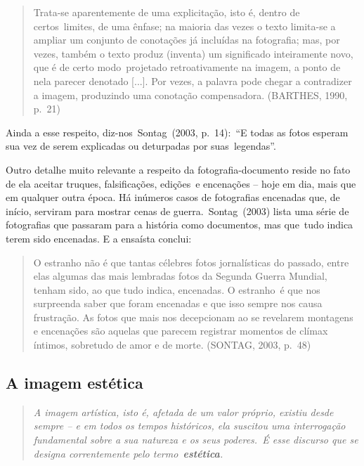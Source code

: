 \documentclass[
  letterpaper,
]{abntex2}
\begin{document}
\begin{quote}
Trata-se aparentemente de uma explicitação, isto é, dentro de
certos~limites, de uma ênfase; na maioria das vezes o texto limita-se a
ampliar um conjunto de conotações já incluídas na fotografia; mas, por
vezes, também o texto produz (inventa) um significado inteiramente novo,
que é de certo modo~projetado retroativamente na imagem, a ponto de nela
parecer denotado {[}...{]}. Por vezes, a palavra pode chegar a
contradizer a imagem, produzindo uma conotação compensadora. (BARTHES,
1990, p.~21)~ ~
\end{quote}

Ainda a esse respeito, diz-nos~Sontag~(2003, p.~14):~``E todas as fotos
esperam sua vez de serem explicadas ou deturpadas por suas~legendas''.

Outro detalhe muito relevante a respeito da fotografia-documento reside
no fato de ela aceitar truques, falsificações, edições~e encenações --
hoje em dia, mais que em qualquer outra época. Há inúmeros casos de
fotografias encenadas que, de início, serviram para mostrar cenas de
guerra.~Sontag~(2003) lista uma série de fotografias que passaram para a
história como documentos, mas que~tudo indica terem sido encenadas. E a
ensaísta conclui:~ ~

\begin{quote}
O estranho não é que tantas célebres fotos jornalísticas do passado,
entre elas algumas das mais lembradas fotos da Segunda Guerra Mundial,
tenham sido, ao que tudo indica, encenadas. O estranho~é que nos
surpreenda saber que foram encenadas e que isso sempre nos causa
frustração. As fotos que mais nos decepcionam ao se revelarem montagens
e encenações são aquelas que parecem registrar momentos de clímax
íntimos, sobretudo de amor e de morte. (SONTAG, 2003, p.~48)~ ~
\end{quote}

\hypertarget{a-imagem-estuxe9tica}{%
\subsection{A imagem estética}\label{a-imagem-estuxe9tica}}

\begin{quote}
\emph{A imagem artística, isto é, afetada de um valor próprio, existiu
desde sempre -- e em todos os tempos históricos, ela suscitou uma
interrogação fundamental sobre a sua natureza e os seus poderes.~É esse
discurso que se designa correntemente pelo termo~\textbf{estética}.}
\end{quote}
\end{document}
